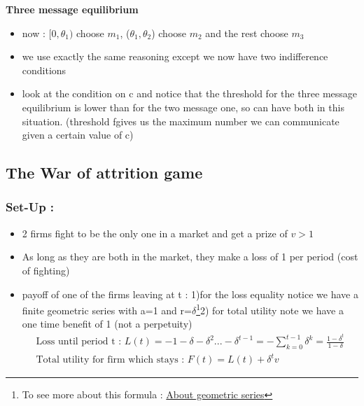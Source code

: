 \documentclass{article}
\begin{document}
\textbf{Three message equilibrium}
\begin{itemize}
    \item now : $[0,\theta_1)$ choose $m_1$, ($\theta_1,\theta_2$) choose $m_2$ and the rest choose $m_3$
    \item we use exactly the same reasoning except we now have two indifference conditions 
    \item look at the condition on c and notice that the threshold for the three message equilibrium is lower than for the two message one, so can have both in this situation. (threshold fgives us the maximum number we can communicate given a certain value of c)
\end{itemize}


\subsection{The War of attrition game}
\subsubsection{Set-Up : }
\begin{itemize}
    \item 2 firms fight to be the only one in a market and get a prize of $v>1$
    \item As long as they are both in the market, they make a loss of 1 per period (cost of fighting)
    \item payoff of one of the firms leaving at t : 1)for the loss equality notice we have a finite geometric series with a=1 and r=$\delta$\footnote{To see more about this formula : \hyperlink{https://en.wikipedia.org/wiki/Geometric_series}{About geometric series}}2) for total utility note we have a one time benefit of 1 (not a perpetuity)
    \begin{equation}
    \begin{aligned}
       \text{Loss until period t : } L(t) = -1-\delta-\delta^2...-\delta^{t-1} = -\sum_{k=0}^{t-1}\delta^k=\frac{1-\delta^t}{1-\delta}\\
       \text{Total utility for firm which stays : } F(t)=L(t)+\delta^tv
    \end{aligned}
    \end{equation}
\end{itemize}
\end{document}
